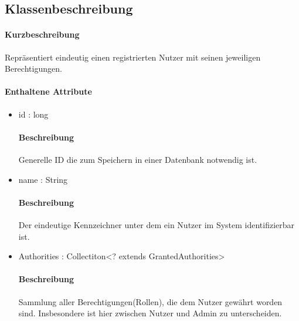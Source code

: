\subsection{Klassenbeschreibung}%
\paragraph*{Kurzbeschreibung}
Repräsentiert eindeutig einen registrierten Nutzer mit seinen jeweiligen Berechtigungen.
\paragraph*{Enthaltene Attribute}
\begin{itemize}
    \item id : long
    		\paragraph*{Beschreibung}
            Generelle ID die zum Speichern in einer Datenbank notwendig ist.
    \item name : String
            \paragraph{Beschreibung}
            Der eindeutige Kennzeichner unter dem ein Nutzer im System identifizierbar ist.
    \item Authorities : Collectiton<? extends GrantedAuthorities>
            \paragraph{Beschreibung}               
            Sammlung aller Berechtigungen(Rollen), die dem Nutzer gewährt worden sind. Insbesondere ist hier zwischen
            \dq Nutzer \dq und \dq Admin \dq zu unterscheiden.
\end{itemize}            